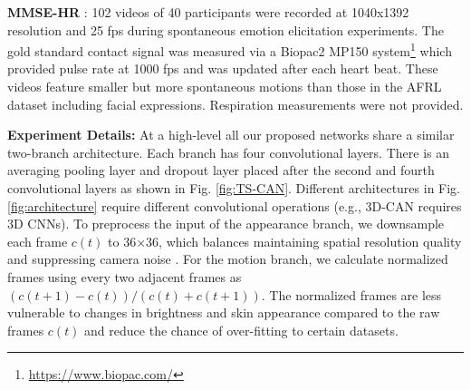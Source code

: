 \documentclass{article}
\begin{document}
\textbf{MMSE-HR} \citep{zhang2016multimodal}: 102 videos of 40 participants were recorded at 1040x1392 resolution and 25 fps during spontaneous emotion elicitation experiments. The gold standard contact signal was measured via a Biopac2 MP150 system\footnote{\url{https://www.biopac.com/}} which provided pulse rate at 1000 fps and was updated after each heart beat. These videos feature smaller but more spontaneous motions than those in the AFRL dataset including facial expressions. Respiration measurements were not provided.

\textbf{Experiment Details:} At a high-level all our proposed networks share a similar two-branch architecture. Each branch has four convolutional layers. There is an averaging pooling layer and dropout layer placed after the second and fourth convolutional layers as shown in Fig. \ref{fig:TS-CAN}. Different architectures in Fig. \ref{fig:architecture} require different convolutional operations (e.g., 3D-CAN requires 3D CNNs). To preprocess the input of the appearance branch, we downsample each frame $c(t)$ to 36$\times$36, which balances maintaining spatial resolution quality and suppressing camera noise \citep{wang2014exploiting}. For the motion branch, we calculate normalized frames using every two adjacent frames as $(c(t+1) - c(t)) / (c(t) + c(t+1))$. The normalized frames are less vulnerable to changes in brightness and skin appearance compared to the raw frames $c(t)$ and reduce the chance of over-fitting to certain datasets. 
\end{document}
